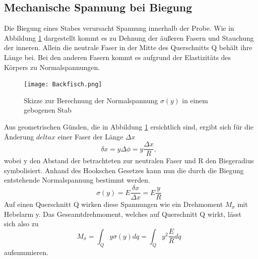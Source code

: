 \subsection{Mechanische Spannung bei Biegung}
    \label{sec:aiaiai}
    Die Biegung eines Stabes verursacht Spannung innerhalb der Probe. Wie in Abbildung \ref{fig:backfisch}
    dargestellt kommt es zu Dehnung der äußeren Fasern und Stauchung der inneren. 
    Allein die neutrale Faser in der Mitte des Querschnitts Q behält ihre Länge bei.
    Bei den anderen Fasern kommt es aufgrund der Elastizitäts des Körpers zu Normalspannungen.
    \begin{figure}
        \centering
        \texttt{[image: Backfisch.png]}
        \caption{Skizze zur Berechnung der Normalspannung $\sigma(y)$ in einem gebogenen Stab}
        \label{fig:backfisch}
    \end{figure}
    Aus geometrischen Günden, die in Abbildung \ref{fig:backfisch} ersichtlich sind, 
    ergibt sich für die Änderung $delta x$ einer Faser der Länge $\Delta x$
    \begin{equation*}
        \delta x = y \Delta \phi= y\dfrac{\Delta x}{R},
    \end{equation*}
    wobei y den Abstand der betrachteten zur neutralen Faser und R den Biegeradius
    symbolisiert. Anhand des Hookschen Gesetzes kann nun die durch die Biegung 
    entstehende Normalspannung bestimmt werden.
    \begin{equation*}
        \sigma(y)=E\dfrac{\delta x}{\Delta x}=E \dfrac{y}{R}
    \end{equation*}
    Auf einen Querschnitt Q wirken diese Spannungen wie ein Drehmoment $M_{\sigma}$ mit
    Hebelarm y. Das Geseamtdrehmoment, welches auf Querschnitt Q wirkt, lässt sich also 
    zu
    \begin{equation}
        \label{eqn:fuckyou}
        M_{\sigma}=\int_Q y \sigma(y)dq = \int_Q y^2 \dfrac{E}{R}dq 
    \end{equation}
    aufsummieren. 
    
